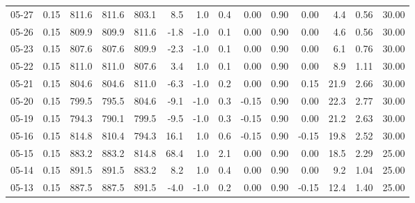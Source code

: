 \begin{threeparttable}
{\begin{tabular}{lrrrrrrrrrrrrr}
  05-27 &     0.15 & 811.6 & 811.6 & 803.1 &        8.5 &                      1.0 &                 0.4 &       0.00 &      0.90 &           0.00 &              4.4 &            0.56 &                  30.00 \\
  05-26 &     0.15 & 809.9 & 809.9 & 811.6 &       -1.8 &                     -1.0 &                 0.1 &       0.00 &      0.90 &           0.00 &              4.6 &            0.56 &                  30.00 \\
  05-23 &     0.15 & 807.6 & 807.6 & 809.9 &       -2.3 &                     -1.0 &                 0.1 &       0.00 &      0.90 &           0.00 &              6.1 &            0.76 &                  30.00 \\
  05-22 &     0.15 & 811.0 & 811.0 & 807.6 &        3.4 &                      1.0 &                 0.1 &       0.00 &      0.90 &           0.00 &              8.9 &            1.11 &                  30.00 \\
  05-21 &     0.15 & 804.6 & 804.6 & 811.0 &       -6.3 &                     -1.0 &                 0.2 &       0.00 &      0.90 &           0.15 &             21.9 &            2.66 &                  30.00 \\
  05-20 &     0.15 & 799.5 & 795.5 & 804.6 &       -9.1 &                     -1.0 &                 0.3 &      -0.15 &      0.90 &           0.00 &             22.3 &            2.77 &                  30.00 \\
  05-19 &     0.15 & 794.3 & 790.1 & 799.5 &       -9.5 &                     -1.0 &                 0.3 &      -0.15 &      0.90 &           0.00 &             21.2 &            2.63 &                  30.00 \\
  05-16 &     0.15 & 814.8 & 810.4 & 794.3 &       16.1 &                      1.0 &                 0.6 &      -0.15 &      0.90 &          -0.15 &             19.8 &            2.52 &                  30.00 \\
  05-15 &     0.15 & 883.2 & 883.2 & 814.8 &       68.4 &                      1.0 &                 2.1 &       0.00 &      0.90 &           0.00 &             18.5 &            2.29 &                  25.00 \\
  05-14 &     0.15 & 891.5 & 891.5 & 883.2 &        8.2 &                      1.0 &                 0.4 &       0.00 &      0.90 &           0.00 &              9.2 &            1.04 &                  25.00 \\
  05-13 &     0.15 & 887.5 & 887.5 & 891.5 &       -4.0 &                     -1.0 &                 0.2 &       0.00 &      0.90 &          -0.15 &             12.4 &            1.40 &                  25.00 \\

\end{tabular}}
\end{threeparttable}

